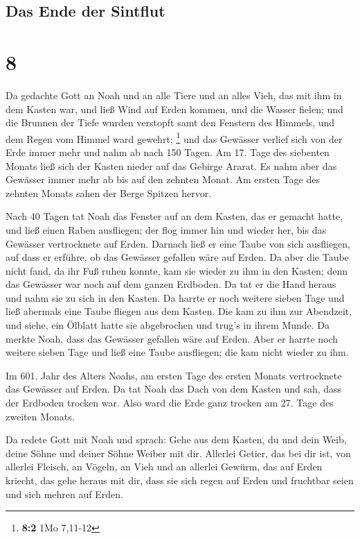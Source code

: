 \hypertarget{das-ende-der-sintflut}{%
\subsection{Das Ende der Sintflut}\label{das-ende-der-sintflut}}

\hypertarget{section-7}{%
\section{8}\label{section-7}}

 Da gedachte Gott an Noah und an alle Tiere und an alles
Vieh, das mit ihm in dem Kasten war, und ließ Wind auf Erden kommen, und
die Wasser fielen;  und die Brunnen der Tiefe wurden
verstopft samt den Fenstern des Himmels, und dem Regen vom Himmel ward
gewehrt; \footnote{\textbf{8:2} 1Mo 7,11-12}  und das
Gewässer verlief sich von der Erde immer mehr und nahm ab nach 150
Tagen.  Am 17. Tage des siebenten Monats ließ sich der
Kasten nieder auf das Gebirge Ararat.  Es nahm aber das
Gewässer immer mehr ab bis auf den zehnten Monat. Am ersten Tage des
zehnten Monats sahen der Berge Spitzen hervor.

 Nach 40 Tagen tat Noah das Fenster auf an dem Kasten, das
er gemacht hatte,  und ließ einen Raben ausfliegen; der
flog immer hin und wieder her, bis das Gewässer vertrocknete auf Erden.
 Darnach ließ er eine Taube von sich ausfliegen, auf dass
er erführe, ob das Gewässer gefallen wäre auf Erden.  Da
aber die Taube nicht fand, da ihr Fuß ruhen konnte, kam sie wieder zu
ihm in den Kasten; denn das Gewässer war noch auf dem ganzen Erdboden.
Da tat er die Hand heraus und nahm sie zu sich in den Kasten.
 Da harrte er noch weitere sieben Tage und ließ abermals
eine Taube fliegen aus dem Kasten.  Die kam zu ihm zur
Abendzeit, und siehe, ein Ölblatt hatte sie abgebrochen und trug's in
ihrem Munde. Da merkte Noah, dass das Gewässer gefallen wäre auf Erden.
 Aber er harrte noch weitere sieben Tage und ließ eine
Taube ausfliegen; die kam nicht wieder zu ihm.

 Im 601. Jahr des Alters Noahs, am ersten Tage des ersten
Monats vertrocknete das Gewässer auf Erden. Da tat Noah das Dach von dem
Kasten und sah, dass der Erdboden trocken war.  Also ward
die Erde ganz trocken am 27. Tage des zweiten Monats.

 Da redete Gott mit Noah und sprach:  Gehe
aus dem Kasten, du und dein Weib, deine Söhne und deiner Söhne Weiber
mit dir.  Allerlei Getier, das bei dir ist, von allerlei
Fleisch, an Vögeln, an Vieh und an allerlei Gewürm, das auf Erden
kriecht, das gehe heraus mit dir, dass sie sich regen auf Erden und
fruchtbar seien und sich mehren auf Erden.

